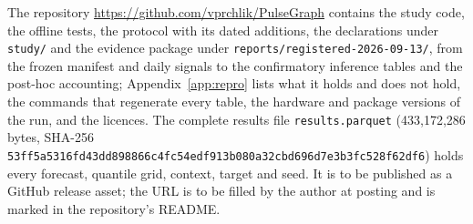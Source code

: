 The repository \url{https://github.com/vprchlik/PulseGraph} contains the study code, the offline tests, the
protocol with its dated additions, the declarations under \texttt{study/} and the evidence package under
\texttt{reports/registered-2026-09-13/}, from the frozen manifest and daily signals to the confirmatory
inference tables and the post-hoc accounting; Appendix~\ref{app:repro} lists what it holds and does not hold,
the commands that regenerate every table, the hardware and package versions of the run, and the licences.
The complete results file \texttt{results.parquet} (433,172,286 bytes, SHA-256
\texttt{53ff5a5316fd43dd898866c4fc54edf913b080a32cbd696d7e3b3fc528f62df6}) holds every forecast, quantile
grid, context, target and seed. It is to be published as a GitHub release asset; the URL is to be filled by
the author at posting and is marked in the repository's README.
